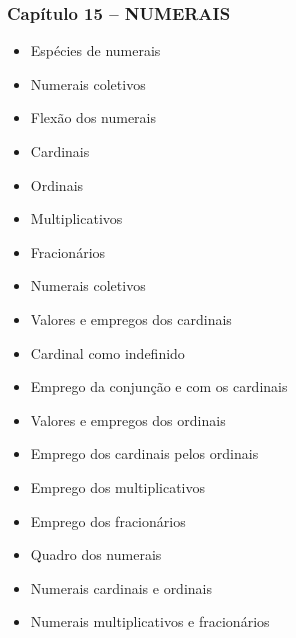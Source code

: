 \documentclass[a4paper,12pt]{article}[abntex2]
\begin{document}
\subsubsection*{Capítulo 15 – NUMERAIS}
\begin{itemize}
    \item Espécies de numerais
    \item Numerais coletivos
    \item Flexão dos numerais
    \item Cardinais
    \item Ordinais
    \item Multiplicativos
    \item Fracionários
    \item Numerais coletivos
    \item Valores e empregos dos cardinais
    \item Cardinal como indefinido
    \item Emprego da conjunção e com os cardinais
    \item Valores e empregos dos ordinais
    \item Emprego dos cardinais pelos ordinais
    \item Emprego dos multiplicativos
    \item Emprego dos fracionários
    \item Quadro dos numerais
    \item Numerais cardinais e ordinais
    \item Numerais multiplicativos e fracionários
\end{itemize}
\end{document}
